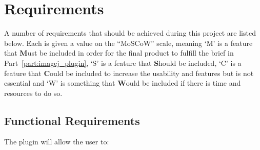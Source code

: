 
\onecolumn
\section{Requirements}
\label{sec:requirements}

A number of requirements that should be achieved during this project are listed
below. Each is given a value on the ``MoSCoW'' scale, meaning `M' is a feature
that \textbf{M}ust be included in order for the final product to fulfill the
brief in Part~\ref{part:imagej_plugin}, `S' is a feature that \textbf{S}hould
be included, `C' is a feature that \textbf{C}ould be included to increase the
usability and features but is not essential and `W' is something that
\textbf{W}ould be included if there is time and resources to do so.

\subsection{Functional Requirements}
\label{sub:functional_requirements}

The plugin will allow the user to:

